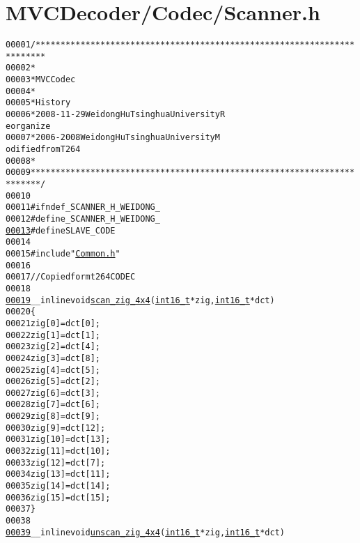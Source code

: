 \hypertarget{_scanner_8h_source}{
\section{MVCDecoder/Codec/Scanner.h}
}


\begin{footnotesize}\begin{alltt}
00001 \textcolor{comment}{/************************************************************************}
00002 \textcolor{comment}{ *}
00003 \textcolor{comment}{ * MVC Codec}
00004 \textcolor{comment}{ * }
00005 \textcolor{comment}{ * History}
00006 \textcolor{comment}{ * 2008-11-29           Weidong Hu              Tsinghua University             R
      eorganize}
00007 \textcolor{comment}{ * 2006-2008            Weidong Hu              Tsinghua University             M
      odified from T264}
00008 \textcolor{comment}{ * }
00009 \textcolor{comment}{ ************************************************************************/}
00010 
00011 \textcolor{preprocessor}{#ifndef \_SCANNER\_H\_WEIDONG\_}
00012 \textcolor{preprocessor}{}\textcolor{preprocessor}{#define \_SCANNER\_H\_WEIDONG\_}
\hypertarget{_scanner_8h_source_l00013}{}\hyperlink{_scanner_8h_a995f6a4907273b8d56b6543ab1a57d17}{00013} \textcolor{preprocessor}{}\textcolor{preprocessor}{#define SLAVE\_CODE}
00014 \textcolor{preprocessor}{}
00015 \textcolor{preprocessor}{#include "\hyperlink{_common_8h}{Common.h}"}
00016 
00017 \textcolor{comment}{// Copied form t264 CODEC}
00018 
\hypertarget{_scanner_8h_source_l00019}{}\hyperlink{_scanner_8h_af6cb76630d5e47f47ae4cca010b91361}{00019} \_\_inline \textcolor{keywordtype}{void} \hyperlink{_scanner_8h_af6cb76630d5e47f47ae4cca010b91361}{scan_zig_4x4}(\hyperlink{_types_8h_ae615613535a2b2445773922f5d45a861}{int16_t}* zig, \hyperlink{_types_8h_ae615613535a2b2445773922f5d45a861}{int16_t}* dct)
00020 \{
00021     zig[0]  = dct[0];
00022     zig[1]  = dct[1];
00023     zig[2]  = dct[4];
00024     zig[3]  = dct[8];
00025     zig[4]  = dct[5];
00026     zig[5]  = dct[2];
00027     zig[6]  = dct[3];
00028     zig[7]  = dct[6];
00029     zig[8]  = dct[9];
00030     zig[9]  = dct[12];
00031     zig[10] = dct[13];
00032     zig[11] = dct[10];
00033     zig[12] = dct[7];
00034     zig[13] = dct[11];
00035     zig[14] = dct[14];
00036     zig[15] = dct[15];
00037 \}
00038 
\hypertarget{_scanner_8h_source_l00039}{}\hyperlink{_scanner_8h_a368d4bb8bcbc27ebecc3939c468dbcff}{00039} \_\_inline \textcolor{keywordtype}{void} \hyperlink{_scanner_8h_a368d4bb8bcbc27ebecc3939c468dbcff}{unscan_zig_4x4}(\hyperlink{_types_8h_ae615613535a2b2445773922f5d45a861}{int16_t}* zig, \hyperlink{_types_8h_ae615613535a2b2445773922f5d45a861}{int16_t}* dct)

\end{alltt}
\end{footnotesize}
